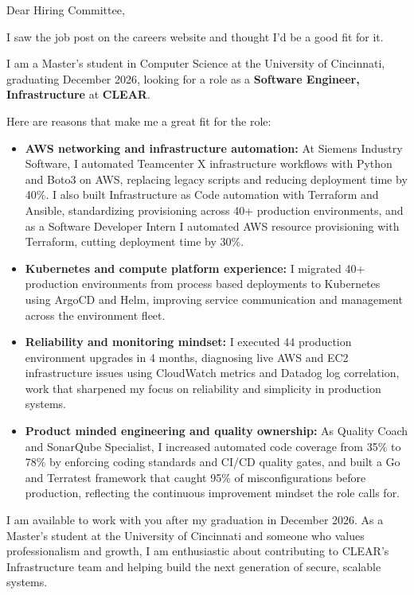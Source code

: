 \documentclass[11pt]{letter}
\date{}
\begin{document}
\begin{letter}{}

\opening{Dear Hiring Committee,}

I saw the job post on the careers website and thought I'd be a good fit for it.

I am a Master's student in Computer Science at the University of Cincinnati, graduating December 2026, looking for a role as a \textbf{Software Engineer, Infrastructure} at \textbf{CLEAR}.

Here are reasons that make me a great fit for the role:

\begin{itemize}[leftmargin=*, itemsep=0.45em]
    \item \textbf{AWS networking and infrastructure automation:} At Siemens Industry Software, I automated Teamcenter X infrastructure workflows with Python and Boto3 on AWS, replacing legacy scripts and reducing deployment time by 40\%. I also built Infrastructure as Code automation with Terraform and Ansible, standardizing provisioning across 40+ production environments, and as a Software Developer Intern I automated AWS resource provisioning with Terraform, cutting deployment time by 30\%.

    \item \textbf{Kubernetes and compute platform experience:} I migrated 40+ production environments from process based deployments to Kubernetes using ArgoCD and Helm, improving service communication and management across the environment fleet.

    \item \textbf{Reliability and monitoring mindset:} I executed 44 production environment upgrades in 4 months, diagnosing live AWS and EC2 infrastructure issues using CloudWatch metrics and Datadog log correlation, work that sharpened my focus on reliability and simplicity in production systems.

    \item \textbf{Product minded engineering and quality ownership:} As Quality Coach and SonarQube Specialist, I increased automated code coverage from 35\% to 78\% by enforcing coding standards and CI/CD quality gates, and built a Go and Terratest framework that caught 95\% of misconfigurations before production, reflecting the continuous improvement mindset the role calls for.
\end{itemize}

I am available to work with you after my graduation in December 2026. As a Master's student at the University of Cincinnati and someone who values professionalism and growth, I am enthusiastic about contributing to CLEAR's Infrastructure team and helping build the next generation of secure, scalable systems.


\end{letter}
\end{document}
